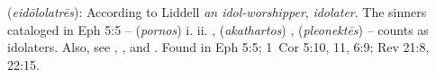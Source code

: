 \item[Idolater,]

(\textit{eidōlolatrēs}):
According to Liddell \emph{an idol-worshipper}, \emph{idolater}. The sinners cataloged in Eph 5:5 --  (\emph{pornos}) i.  ii. ,  (\emph{akathartos}) ,  (\emph{pleonektēs})  -- counts as idolaters. Also, see , , and .
Found in Eph 5:5; 1~Cor 5:10, 11, 6:9; Rev 21:8, 22:15.
